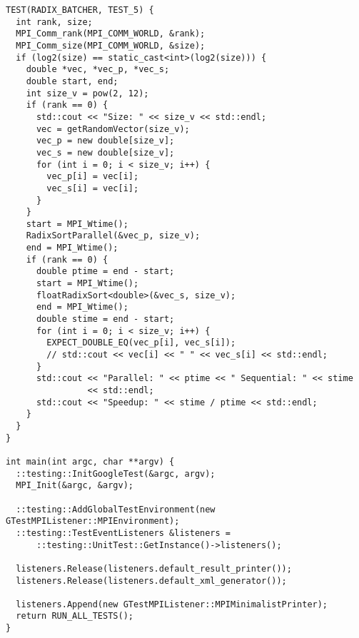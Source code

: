 \documentclass{report}
\begin{document}
\begin{lstlisting}
TEST(RADIX_BATCHER, TEST_5) {
  int rank, size;
  MPI_Comm_rank(MPI_COMM_WORLD, &rank);
  MPI_Comm_size(MPI_COMM_WORLD, &size);
  if (log2(size) == static_cast<int>(log2(size))) {
    double *vec, *vec_p, *vec_s;
    double start, end;
    int size_v = pow(2, 12);
    if (rank == 0) {
      std::cout << "Size: " << size_v << std::endl;
      vec = getRandomVector(size_v);
      vec_p = new double[size_v];
      vec_s = new double[size_v];
      for (int i = 0; i < size_v; i++) {
        vec_p[i] = vec[i];
        vec_s[i] = vec[i];
      }
    }
    start = MPI_Wtime();
    RadixSortParallel(&vec_p, size_v);
    end = MPI_Wtime();
    if (rank == 0) {
      double ptime = end - start;
      start = MPI_Wtime();
      floatRadixSort<double>(&vec_s, size_v);
      end = MPI_Wtime();
      double stime = end - start;
      for (int i = 0; i < size_v; i++) {
        EXPECT_DOUBLE_EQ(vec_p[i], vec_s[i]);
        // std::cout << vec[i] << " " << vec_s[i] << std::endl;
      }
      std::cout << "Parallel: " << ptime << " Sequential: " << stime
                << std::endl;
      std::cout << "Speedup: " << stime / ptime << std::endl;
    }
  }
}

int main(int argc, char **argv) {
  ::testing::InitGoogleTest(&argc, argv);
  MPI_Init(&argc, &argv);

  ::testing::AddGlobalTestEnvironment(new GTestMPIListener::MPIEnvironment);
  ::testing::TestEventListeners &listeners =
      ::testing::UnitTest::GetInstance()->listeners();

  listeners.Release(listeners.default_result_printer());
  listeners.Release(listeners.default_xml_generator());

  listeners.Append(new GTestMPIListener::MPIMinimalistPrinter);
  return RUN_ALL_TESTS();
}
\end{lstlisting}
\end{document}
